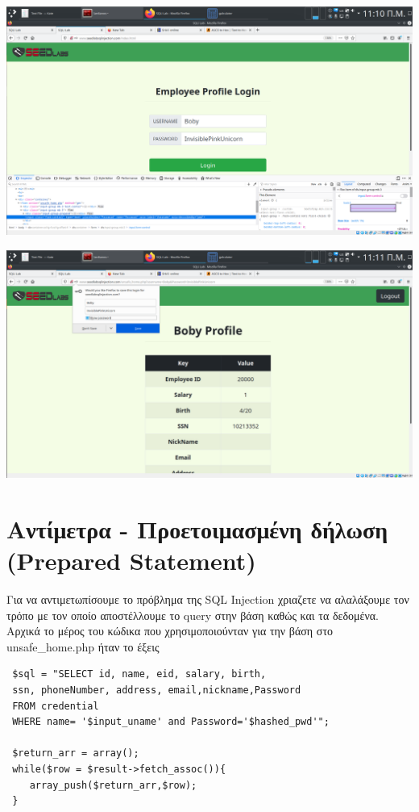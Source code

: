 \begin{center}
			\includegraphics[width=1\textwidth]{image/3.3.3.PNG}		
\end{center}

\begin{center}
			\includegraphics[width=1\textwidth]{image/3.3.4.PNG}		
\end{center}

\section{Αντίμετρα - Προετοιμασμένη δήλωση (Prepared Statement)}

\noindent
Για να αντιμετωπίσουμε το πρόβλημα της SQL Injection χριαζετε να αλαλάξουμε τον τρόπο
με τον οποίο αποστέλλουμε το query στην βάση καθώς και τα δεδομένα. Αρχικά το
μέρος του κώδικα που χρησιμοποιούνταν για την βάση στο unsafe\_home.php ήταν το έξεις

\begin{center}
	\begin{lstlisting}
 $sql = "SELECT id, name, eid, salary, birth,
 ssn, phoneNumber, address, email,nickname,Password
 FROM credential
 WHERE name= '$input_uname' and Password='$hashed_pwd'";
 
 $return_arr = array();
 while($row = $result->fetch_assoc()){
 	array_push($return_arr,$row);
 }      
	\end{lstlisting}	
\end{center}

